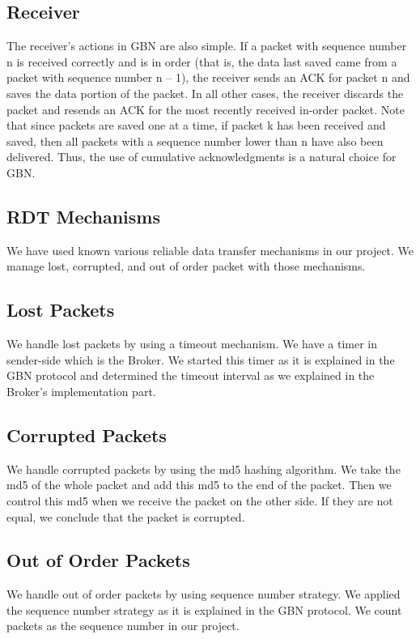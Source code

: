 \documentclass[conference]{IEEEtran}
\begin{document}
\subsection*{Receiver}

The receiver’s actions in GBN are also simple. If a packet with sequence number n is received correctly and is in order (that is, the data last saved came from a packet with sequence number n – 1), the receiver sends an ACK for packet n and saves the data portion of the packet. In all other cases, the receiver discards the packet and resends an ACK for the most recently received in-order packet. Note that since packets are saved one at a time, if packet k has been received and saved, then all packets with a sequence number lower than n have also been delivered. Thus, the use of cumulative acknowledgments is a natural choice for GBN.


\subsection{RDT Mechanisms}

We have used known various reliable data transfer mechanisms in our project. We manage lost, corrupted, and out of order packet with those mechanisms.


\subsection*{Lost Packets}

We handle lost packets by using a timeout mechanism. We have a timer in sender-side which is the Broker. We started this timer as it is explained in the GBN protocol and determined the timeout interval as we explained in the Broker's implementation part.

\subsection*{Corrupted Packets}

We handle corrupted packets by using the md5 hashing algorithm. We take the md5 of the whole packet and add this md5 to the end of the packet. Then we control this md5 when we receive the packet on the other side. If they are not equal, we conclude that the packet is corrupted.

\subsection*{Out of Order Packets}
We handle out of order packets by using sequence number strategy. We applied the sequence number strategy as it is explained in the GBN protocol. We count packets as the sequence number in our project.
\end{document}
